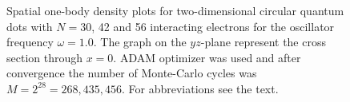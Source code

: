\begin{landscape}
\begin{figure} [H]
		\hspace{0.1cm}
		\hspace{-0.0cm}
		\hspace{-0.0cm}
		\hspace{-0.0cm}
		
		\caption{Spatial one-body density plots for two-dimensional circular quantum dots with $N=30$, 42 and 56 interacting electrons for the oscillator frequency $\omega=1.0$. The graph on the $yz$-plane represent the cross section through $x=0$. ADAM optimizer was used and after convergence the number of Monte-Carlo cycles was $M=2^{28}=268,435,456$. For abbreviations see the text.}%
		\label{fig:OB2_interaction_large}
	\end{figure}
\end{landscape}

